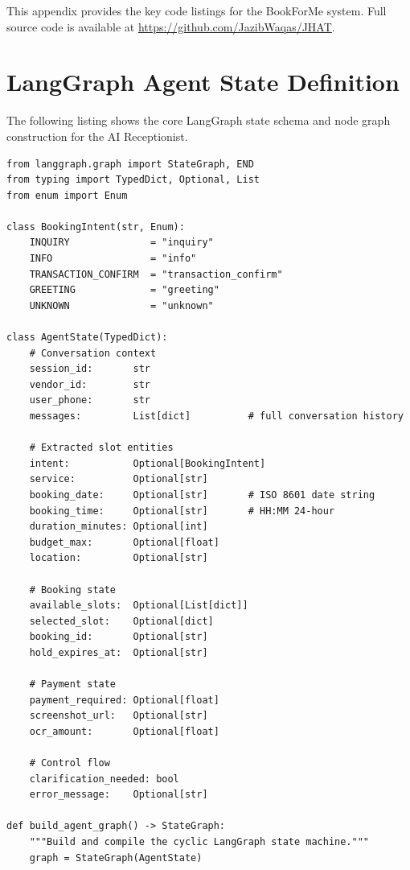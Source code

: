 This appendix provides the key code listings for the BookForMe system.  Full source
code is available at \url{https://github.com/JazibWaqas/JHAT}.

\section{LangGraph Agent State Definition}
\label{app:code-langgraph}

The following listing shows the core LangGraph state schema and node graph
construction for the AI Receptionist.

\begin{lstlisting}[style=pythonstyle, caption={LangGraph agent state schema and graph construction (agent/graph.py).}]
from langgraph.graph import StateGraph, END
from typing import TypedDict, Optional, List
from enum import Enum

class BookingIntent(str, Enum):
    INQUIRY              = "inquiry"
    INFO                 = "info"
    TRANSACTION_CONFIRM  = "transaction_confirm"
    GREETING             = "greeting"
    UNKNOWN              = "unknown"

class AgentState(TypedDict):
    # Conversation context
    session_id:       str
    vendor_id:        str
    user_phone:       str
    messages:         List[dict]          # full conversation history

    # Extracted slot entities
    intent:           Optional[BookingIntent]
    service:          Optional[str]
    booking_date:     Optional[str]       # ISO 8601 date string
    booking_time:     Optional[str]       # HH:MM 24-hour
    duration_minutes: Optional[int]
    budget_max:       Optional[float]
    location:         Optional[str]

    # Booking state
    available_slots:  Optional[List[dict]]
    selected_slot:    Optional[dict]
    booking_id:       Optional[str]
    hold_expires_at:  Optional[str]

    # Payment state
    payment_required: Optional[float]
    screenshot_url:   Optional[str]
    ocr_amount:       Optional[float]

    # Control flow
    clarification_needed: bool
    error_message:    Optional[str]

def build_agent_graph() -> StateGraph:
    """Build and compile the cyclic LangGraph state machine."""
    graph = StateGraph(AgentState)


\end{lstlisting}
